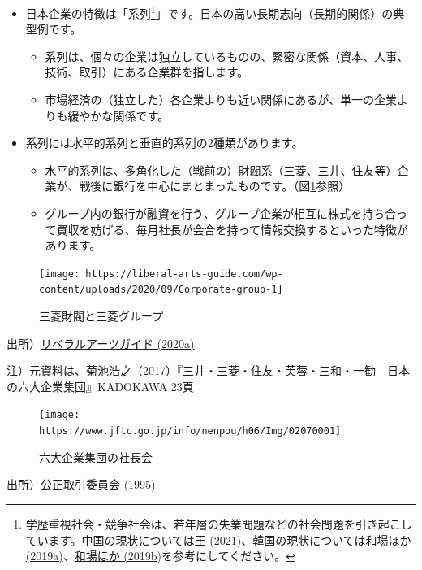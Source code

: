 \documentclass[
]{book}
\begin{document}
\begin{itemize}
\item
  日本企業の特徴は「系列\footnote{学歴重視社会・競争社会は、若年層の失業問題などの社会問題を引き起こしています。中国の現状については\href{https://diamond.jp/articles/-/277433}{王 (2021)}、韓国の現状については\href{https://hbol.jp/pc/189601/}{和場ほか (2019a)}、\href{https://hbol.jp/pc/189810/}{和場ほか (2019b)}を参考にしてください。}」です。日本の高い長期志向（長期的関係）の典型例です。

  \begin{itemize}
  \item
    系列は、個々の企業は独立しているものの、緊密な関係（資本、人事、技術、取引）にある企業群を指します。
  \item
    市場経済の（独立した）各企業よりも近い関係にあるが、単一の企業よりも緩やかな関係です。
  \end{itemize}
\item
  系列には水平的系列と垂直的系列の2種類があります。

  \begin{itemize}
  \item
    水平的系列は、多角化した（戦前の）財閥系（三菱、三井、住友等）企業が、戦後に銀行を中心にまとまったものです。（図\ref{fig:mitsubishi}参照）
  \item
    グループ内の銀行が融資を行う、グループ企業が相互に株式を持ち合って買収を妨げる、毎月社長が会合を持って情報交換するといった特徴があります。
  \end{itemize}
\end{itemize}

\begin{figure}
\texttt{[image: https://liberal-arts-guide.com/wp-content/uploads/2020/09/Corporate-group-1]} \caption{三菱財閥と三菱グループ}\label{fig:mitsubishi}
\end{figure}

出所）\href{https://liberal-arts-guide.com/corporate-group/}{リベラルアーツガイド (2020a)}

注）元資料は、菊池浩之（2017）『三井・三菱・住友・芙蓉・三和・一勧　日本の六大企業集団』KADOKAWA 23頁

\begin{figure}
\texttt{[image: https://www.jftc.go.jp/info/nenpou/h06/Img/02070001]} \caption{六大企業集団の社長会}\label{fig:bigsix}
\end{figure}

出所）\href{https://www.jftc.go.jp/info/nenpou/h06/02070002.html}{公正取引委員会 (1995)}
\end{document}
